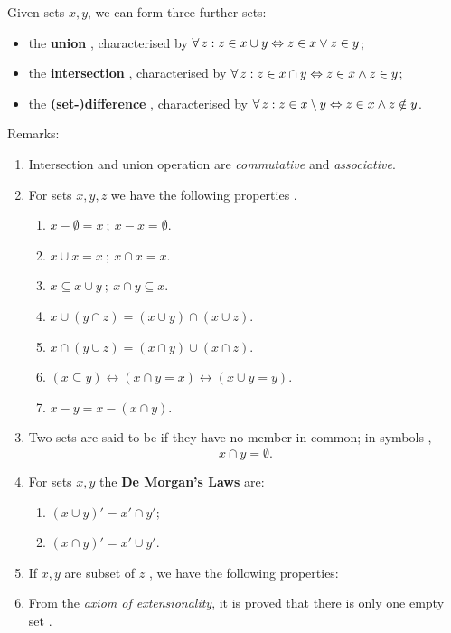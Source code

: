\documentclass[12pt]{book}
\begin{document}
Given sets $x, y$, we can form three further sets:
\begin{itemize}
      \item the \textbf{union} , characterised by $\fa\, z : z \in x \cup y \Lra z \in x \vee z \in y$;
      \item the \textbf{intersection} , characterised by $\fa\, z : z \in x \cap y \Lra z \in x \wedge z \in y$;
      \item the \textbf{(set-)difference} , characterised by $\fa\, z : z \in x \sm y \Lra z \in x \wedge z \notin y$.
\end{itemize}
Remarks:
\begin{enumerate}
      \item Intersection and union operation are {\it commutative} and {\it associative}.
      \item For sets $x, y, z$ we have the following properties \cite{h1}.
      \begin{enumerate}
            \item $x - \emptyset = x\ ;\ x - x = \emptyset $. 
            \item $x \cup x = x\ ;\ x \cap x = x $.
            \item $x \subseteq x \cup y\ ;\ x \cap y \subseteq x$.
            \item $x \cup (y \cap z) = (x \cup y) \cap (x \cup z)$.
            \item $x \cap (y \cup z) = (x \cap y) \cup (x \cap z)$.
            \item $(x \subseteq y) \leftrightarrow (x \cap y=x) \leftrightarrow (x \cup y = y)$.
            \item $x - y = x - (x \cap y)$.
      \end{enumerate}
      \item Two sets are said to be  if they have no member in common; in symbols \cite{h1},
      $$ x \cap y = \emptyset .$$
      \item  For sets $x, y$ the \textbf{De Morgan's Laws} are:
	  \begin{enumerate}
	        \item $ ( x \cup y)' = x' \cap y' $;
			\item $ ( x \cap y)' = x' \cup y' $.
	  \end{enumerate}
	  \item If $x, y $ are subset of $z$ , we have the following properties:
      \begin{enumerate}
	        \item $z - ( z - x ) = x$;
	        \item $(x \subseteq y) \leftrightarrow [(z - y) \subseteq (z - x)]}$;
	        \item $x \cup (z - x) = z$;
	        \item $z - (x \cup y) = (z - x) \cap (z - y)$;
	        \item $z - (x \cap y) = (z - x) \cup (z - y)$.
	  \end{enumerate}
      \item From the {\it axiom of extensionality}, it is proved that there is only one empty set \cite{h1}.
\end{enumerate}
\end{document}
